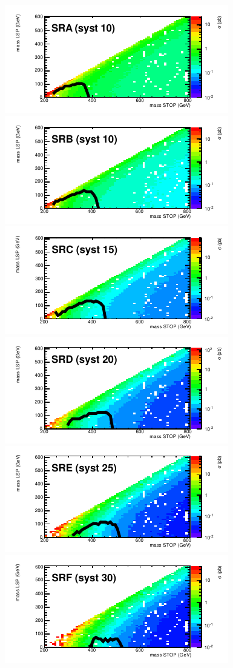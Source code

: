 \begin{figure}[hbt]
  \begin{center}
        \includegraphics[width=0.5\linewidth]{plots/stopPlot/masses_SRA_xsecO.pdf}%
        \includegraphics[width=0.5\linewidth]{plots/stopPlot/masses_SRB_xsecO.pdf}
        \includegraphics[width=0.5\linewidth]{plots/stopPlot/masses_SRC_xsecO.pdf}%
        \includegraphics[width=0.5\linewidth]{plots/stopPlot/masses_SRD_xsecO.pdf}
        \includegraphics[width=0.5\linewidth]{plots/stopPlot/masses_SRE_xsecO.pdf}%
        \includegraphics[width=0.5\linewidth]{plots/stopPlot/masses_SRF_xsecO.pdf}

\end{center}
\end{figure}
